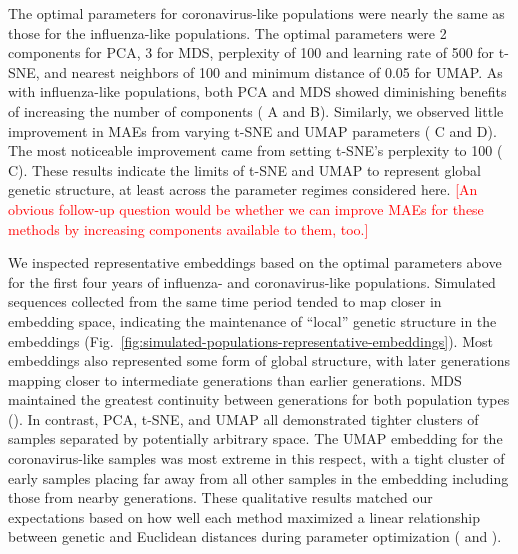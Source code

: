 \documentclass[10pt,letterpaper]{article}
\def\jhc#1{\textcolor{red}{[#1]}}
\begin{document}
The optimal parameters for coronavirus-like populations were nearly the same as those for the influenza-like populations.
The optimal parameters were 2 components for PCA, 3 for MDS, perplexity of 100 and learning rate of 500 for t-SNE, and nearest neighbors of 100 and minimum distance of 0.05 for UMAP.
As with influenza-like populations, both PCA and MDS showed diminishing benefits of increasing the number of components ( A and B).
Similarly, we observed little improvement in MAEs from varying t-SNE and UMAP parameters ( C and D).
The most noticeable improvement came from setting t-SNE's perplexity to 100 ( C).
These results indicate the limits of t-SNE and UMAP to represent global genetic structure, at least across the parameter regimes considered here.
\jhc{An obvious follow-up question would be whether we can improve MAEs for these methods by increasing components available to them, too.}

We inspected representative embeddings based on the optimal parameters above for the first four years of influenza- and coronavirus-like populations.
Simulated sequences collected from the same time period tended to map closer in embedding space, indicating the maintenance of ``local'' genetic structure in the embeddings (Fig.~\ref{fig:simulated-populations-representative-embeddings}).
Most embeddings also represented some form of global structure, with later generations mapping closer to intermediate generations than earlier generations.
MDS maintained the greatest continuity between generations for both population types ().
In contrast, PCA, t-SNE, and UMAP all demonstrated tighter clusters of samples separated by potentially arbitrary space.
The UMAP embedding for the coronavirus-like samples was most extreme in this respect, with a tight cluster of early samples placing far away from all other samples in the embedding including those from nearby generations.
These qualitative results matched our expectations based on how well each method maximized a linear relationship between genetic and Euclidean distances during parameter optimization ( and ).
\end{document}
